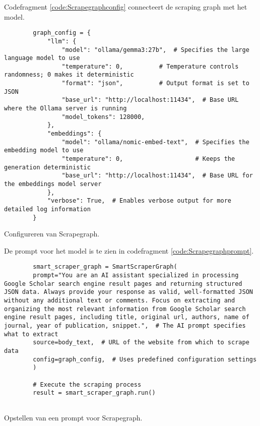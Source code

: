 Codefragment \ref{code:Scrapegraphconfig} connecteert de scraping graph met het model.
\begin{listing}[h!]
    \begin{verbatim}
        graph_config = {
            "llm": {
                "model": "ollama/gemma3:27b",  # Specifies the large language model to use
                "temperature": 0,          # Temperature controls randomness; 0 makes it deterministic
                "format": "json",          # Output format is set to JSON
                "base_url": "http://localhost:11434",  # Base URL where the Ollama server is running
                "model_tokens": 128000,
            },
            "embeddings": {
                "model": "ollama/nomic-embed-text",  # Specifies the embedding model to use
                "temperature": 0,                    # Keeps the generation deterministic
                "base_url": "http://localhost:11434",  # Base URL for the embeddings model server
            },
            "verbose": True,  # Enables verbose output for more detailed log information
        }
    \end{verbatim}
    \caption[Scrapegraph configuratie]{Configureren van Scrapegraph.}
    \label{code:Scrapegraphconfig}
\end{listing}
De prompt voor het model is te zien in codefragment \ref{code:Scrapegraphprompt}.
\begin{listing}[h!]
    \begin{verbatim}
        smart_scraper_graph = SmartScraperGraph(
        prompt="You are an AI assistant specialized in processing Google Scholar search engine result pages and returning structured JSON data. Always provide your response as valid, well-formatted JSON without any additional text or comments. Focus on extracting and organizing the most relevant information from Google Scholar search engine result pages, including title, original url, authors, name of journal, year of publication, snippet.",  # The AI prompt specifies what to extract
        source=body_text,  # URL of the website from which to scrape data
        config=graph_config,  # Uses predefined configuration settings
        )
        
        # Execute the scraping process
        result = smart_scraper_graph.run()
        
    \end{verbatim}
    \caption[Scrapegraph Prompt]{Opstellen van een prompt voor Scrapegraph.}
    \label{code:Scrapegraphprompt}
\end{listing}
